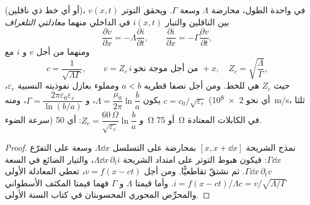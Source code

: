 \begin{proposition}\label{prop:b2:dispersion-wave-packets:coax}
 (أو أي خط ذي ناقلين)، في واحدة الطول،
محارضة $\Lambda$ وسعة $\Gamma$. ويحقق التوتر $v(x, t)$ بين
الناقلين والتيار $i(x, t)$ في الداخلي منهما
\emph{معادلتي التلغراف}
\[
\frac{\partial v}{\partial x} = -\Lambda\frac{\partial i}{\partial t} , \qquad
\frac{\partial i}{\partial x} = -\Gamma\frac{\partial v}{\partial t} ,
\]
ومنهما  من أجل $v$ و $i$ مع
\[
c = \frac1{\sqrt{\Lambda\Gamma}} , \qquad
v = Z_c\,i \ \text{من أجل موجة نحو } +x, \quad Z_c = \sqrt{\frac\Lambda\Gamma} ,
\]
حيث $Z_c$ هي \emph{} للخط. ومن أجل
 نصفا قطريه $a < b$ ومملوء بعازل نفوذيته
النسبية $\varepsilon_r$، يكون $\Lambda = \dfrac{\mu_0}{2\pi}\ln\dfrac ba$، و $\Gamma =
\dfrac{2\pi\varepsilon_0\varepsilon_r}{\ln(b/a)}$، ومنه $c = c_0/\sqrt{\varepsilon_r}$ (أي نحو
\qty{2e8}{m/s}، ثلثا سرعة الضوء) و $Z_c = \dfrac{60\,\Omega}
{\sqrt{\varepsilon_r}}\ln\dfrac ba$: أي \qty{50}{\ohm} أو \qty{75}{\ohm} في الكابلات المعتادة.
\end{proposition}

\begin{proof}
نمذج الشريحة $[x, x + \dd x]$ بمحارضة على التسلسل $\Lambda\dd x$ وسعة
على التفرّع $\Gamma\dd x$: فيكون هبوط التوتر على امتداد الشريحة
$\Lambda\dd x\,\partial_ti$، والتيار الضائع في السعة $\Gamma\dd x
\,\partial_tv$. ثم نشتقّ تقاطعيًّا. ومن أجل $v = f(x - ct)$، تعطي المعادلة الأولى
$i = f(x - ct)/\Lambda c = v/\sqrt{\Lambda/\Gamma}$. وأما قيمتا $\Lambda$ و
$\Gamma$ فهما قيمتا المكثف الأسطواني والمحرِّض المحوري
المحسوبتان في كتاب السنة الأولى.
\end{proof}


